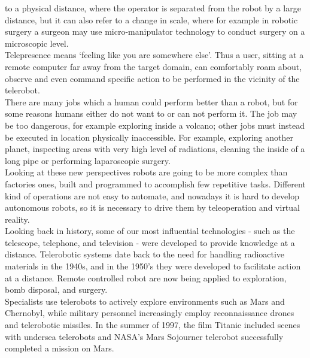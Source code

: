 to a physical distance, where the operator is separated from the robot
by a large distance, but it can also refer to a change in scale, where
for example in robotic surgery a surgeon may use micro-manipulator
technology to conduct surgery on a microscopic level.
\\
Telepresence means `feeling like you are somewhere else'.
Thus a user, sitting at a remote computer far away from the target
domain, can comfortably roam about, observe and even command
specific action to be performed in the vicinity of the telerobot.
\\
There are many jobs which a human could perform better than a robot, but
for some reasons humans either do not want to or can not perform it.
The job may be too dangerous, for example exploring inside a volcano;
other jobs must instead be executed in location physically inaccessible.
For example, exploring another planet, inspecting areas with very high
level of radiations, cleaning the inside of a long pipe or performing
laparoscopic surgery.
\\
Looking at these new perspectives robots are going to be more complex
than factories ones, built and programmed to accomplish few repetitive
tasks. Different kind of operations are not easy
to automate, and nowadays it is hard to develop autonomous robots, so
it is necessary to drive them by teleoperation and virtual reality.
\\
Looking back in history, some of our most influential technologies
- such as the telescope,
telephone, and television - were developed to provide knowledge
at a distance. Telerobotic systems date back to the need for handling
radioactive materials in the 1940s, and in the 1950's they were developed
to facilitate action at a distance. Remote controlled robot are now
being applied to exploration, bomb disposal, and surgery.
\\
Specialists use telerobots to actively explore environments such
as Mars and Chernobyl, while military personnel increasingly employ
reconnaissance drones and telerobotic missiles.
In the summer of 1997, the film Titanic included scenes with undersea
telerobots and NASA's Mars Sojourner telerobot successfully
completed a mission on Mars.
